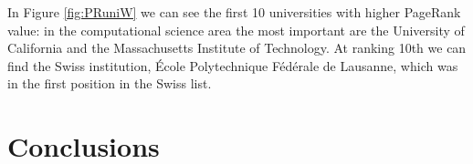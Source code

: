 \documentclass[]{usiinfbachelorproject}
\begin{document}
In Figure \ref{fig:PRuniW} we can see the first 10 universities with higher PageRank value: in the computational science area the most important are the University of California and the Massachusetts Institute of Technology. At ranking 10th we can find the Swiss institution, \'{E}cole Polytechnique F\'{e}d\'{e}rale de Lausanne, which was in the first position in the Swiss list.










\section{Conclusions} \label{sec:conclusions}
\end{document}
